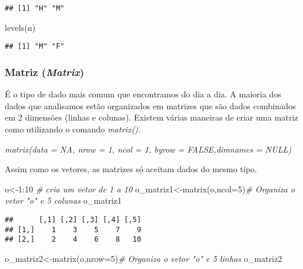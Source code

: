 \documentclass[
]{book}
\newenvironment{Shaded}{\begin{snugshade}}{\end{snugshade}}
\newcommand{\AttributeTok}[1]{\textcolor[rgb]{0.77,0.63,0.00}{#1}}
\newcommand{\CommentTok}[1]{\textcolor[rgb]{0.56,0.35,0.01}{\textit{#1}}}
\newcommand{\DecValTok}[1]{\textcolor[rgb]{0.00,0.00,0.81}{#1}}
\newcommand{\FunctionTok}[1]{\textcolor[rgb]{0.00,0.00,0.00}{#1}}
\newcommand{\NormalTok}[1]{#1}
\newcommand{\OtherTok}[1]{\textcolor[rgb]{0.56,0.35,0.01}{#1}}
\newcommand{\SpecialCharTok}[1]{\textcolor[rgb]{0.00,0.00,0.00}{#1}}
\begin{document}
\begin{verbatim}
## [1] "H" "M"
\end{verbatim}

\begin{Shaded}
\begin{Highlighting}[]
\FunctionTok{levels}\NormalTok{(n)}
\end{Highlighting}
\end{Shaded}

\begin{verbatim}
## [1] "M" "F"
\end{verbatim}

\hypertarget{matriz-matrix}{%
\subsubsection{\texorpdfstring{Matriz (\emph{Matrix})}{Matriz (Matrix)}}\label{matriz-matrix}}

É o tipo de dado mais comum que encontramos do dia a dia. A maioria dos dados que analisamos estão organizados em matrizes que são dados combinados em 2 dimensões (linhas e colunas).
Existem várias maneiras de criar uma matriz como utilizando o comando \emph{matrix()}.

\emph{\emph{matrix(data = NA, nrow = 1, ncol = 1, byrow = FALSE,dimnames = NULL)}}

Assim como os vetores, as matrizes só aceitam dados do mesmo tipo.

\begin{Shaded}
\begin{Highlighting}[]
\NormalTok{o}\OtherTok{\textless{}{-}}\DecValTok{1}\SpecialCharTok{:}\DecValTok{10} \CommentTok{\# cria um vetor de 1 a 10}
\NormalTok{o\_matriz1}\OtherTok{\textless{}{-}}\FunctionTok{matrix}\NormalTok{(o,}\AttributeTok{ncol=}\DecValTok{5}\NormalTok{)}\CommentTok{\# Organiza o vetor "o" e 5 colunas}
\NormalTok{o\_matriz1}
\end{Highlighting}
\end{Shaded}

\begin{verbatim}
##      [,1] [,2] [,3] [,4] [,5]
## [1,]    1    3    5    7    9
## [2,]    2    4    6    8   10
\end{verbatim}

\begin{Shaded}
\begin{Highlighting}[]
\NormalTok{o\_matriz2}\OtherTok{\textless{}{-}}\FunctionTok{matrix}\NormalTok{(o,}\AttributeTok{nrow=}\DecValTok{5}\NormalTok{)}\CommentTok{\# Organiza o vetor "o" e 5 linhas}
\NormalTok{o\_matriz2}
\end{Highlighting}
\end{Shaded}
\end{document}
